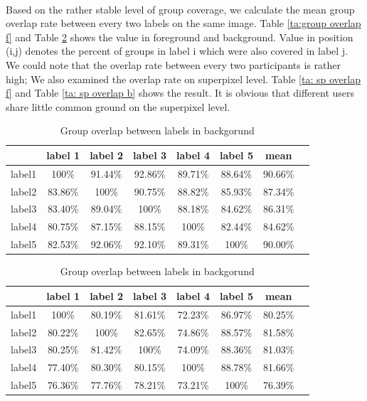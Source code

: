 \documentclass[runningheads,a4paper]{llncs}
\begin{document}
\paragraph{} Based on the rather stable level of group coverage, we calculate the mean group overlap rate between every two labels on the same image. Table \ref{ta:group overlap f} and Table \ref{ta:group overlap b}  shows the value in foreground and background. Value in position (i,j) denotes the percent of groups in label i which were also covered in label j. We could note that the overlap rate between every two participants is rather high; We also examined the overlap rate on superpixel level. Table \ref{ta: sp overlap f} and Table \ref{ta: sp overlap b} shows the result. It is obvious that different users share little common ground on the superpixel level. 

\begin{table}
\parbox{.35\linewidth}{
\centering
\begin{tabular}{|c|c|c|c|c|c|c|c|}
\hline
 & label 1 & label 2&label 3&label 4&label 5&mean\\
\hline
label1& 100\% & 91.44\% & 92.86\%& 89.71\%& 88.64\%&90.66\%\\
\hline
label2& 83.86\% & 100\% & 90.75\%& 88.82\%& 85.93\%&87.34\%\\
\hline
label3& 83.40\% & 89.04\% & 100\%& 88.18\%& 84.62\%&86.31\% \\
\hline
label4& 80.75\% & 87.15\% & 88.15\%& 100\%& 82.44\%&84.62\% \\
\hline
label5& 82.53\% & 92.06\% & 92.10\%& 89.31\%& 100\%&90.00\% \\
\hline
\end{tabular}\captionsetup{justification=centerlast}
\caption{Group overlap between labels in foregorund}
\label{ta:group overlap f}
}
\hfill
\parbox{.35\linewidth}{
\centering
\begin{tabular}{|c|c|c|c|c|c|c|c|}
\hline
 & label 1 & label 2&label 3&label 4&label 5&mean\\
\hline
label1& 100\% &80.19\% & 81.61\%& 72.23\%& 86.97\%&80.25\%\\
\hline
label2& 80.22\% & 100\% & 82.65\%& 74.86\%& 88.57\%&81.58\% \\
\hline
label3& 80.25\% & 81.42\% & 100\%& 74.09\%& 88.36\%&81.03\%\\
\hline
label4& 77.40\% & 80.30\% & 80.15\%& 100\%& 88.78\%&81.66\% \\
\hline
label5& 76.36\% & 77.76\% & 78.21\%& 73.21\%& 100\%&76.39\%\\
\hline
\end{tabular}

\captionsetup{justification=centerlast}
\caption{Group overlap between labels in backgorund}
\label{ta:group overlap b}
}
\end{table}
\end{document}
